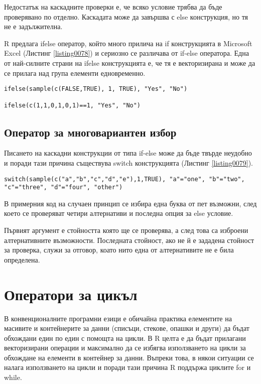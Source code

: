 Недостатък на каскадните проверки е, че всяко условие трябва да бъде проверявано по отделно. Каскадата може да завършва с else конструкция, но тя не е задължителна. 

R предлага ifelse оператор, който много прилича на if конструкцията в Microsoft Excel (Листинг \ref{listing0078}) и сериозно се различава от if-else оператора. Една от най-силните страни на ifelse конструкцията е, че тя е векторизирана и може да се прилага над група елементи едновременно. 

\begin{lstlisting}[caption=Функцията ifelse, label=listing0078]
ifelse(sample(c(FALSE,TRUE), 1, TRUE), "Yes", "No")

ifelse(c(1,1,0,1,0,1)==1, "Yes", "No")
\end{lstlisting}

\subsection{Оператор за многовариантен избор}

Писането на каскадни конструкции от типа if-else може да бъде твърде неудобно и поради тази причина съществува switch конструкцията (Листинг \ref{listing0079}).

\begin{lstlisting}[caption=Конструкция за многовариантен избор switch, label=listing0079]
switch(sample(c("a","b","c","d","e"),1,TRUE), "a"="one", "b"="two", "c"="three", "d"="four", "other")
\end{lstlisting}

В примерния код на случаен принцип се избира една буква от пет възможни, след което се проверяват четири алтернативи и последна опция за else условие. 

Първият аргумент е стойността която ще се проверява, а след това са изброени алтернативните възможности. Последната стойност, ако не й е зададена стойност за проверка, служи за отговор, коато нито една от алтернативите не е била определена. 

\section{Оператори за цикъл}

В конвенционалните програмни езици е обичайна практика елементите на масивите и контейнерите за данни (списъци, стекове, опашки и други) да бъдат обхождани един по един с помощта на цикли. В R целта е да бъдат прилагани векторизирани операции и максимално да се избягва използването на цикли за обхождане на елементи в контейнер за данни. Въпреки това, в някои ситуации се налага използването на цикли и поради тази причина R поддържа циклите for и while. 

